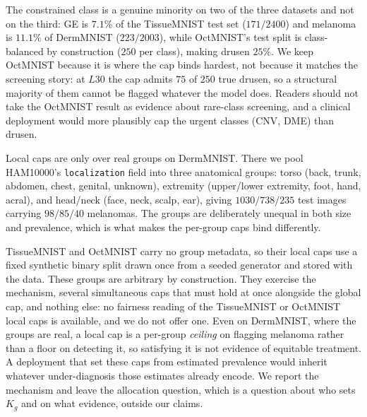 \documentclass[10pt]{article}
\begin{document}
The constrained class is a genuine minority on two of the three
datasets and not on the third: GE is $7.1\%$ of the TissueMNIST test
set ($171/2400$) and melanoma is $11.1\%$ of DermMNIST ($223/2003$),
while OctMNIST's test split is class-balanced by construction ($250$
per class), making drusen $25\%$. We keep OctMNIST because it is where
the cap binds hardest, not because it matches the screening story: at
$L30$ the cap admits $75$ of $250$ true drusen, so a structural
majority of them cannot be flagged whatever the model does. Readers
should not take the OctMNIST result as evidence about rare-class
screening, and a clinical deployment would more plausibly cap the
urgent classes (CNV, DME) than drusen.

Local caps are only over real groups on DermMNIST. There we pool
HAM10000's \texttt{localization} field into three anatomical groups:
torso (back, trunk, abdomen, chest, genital, unknown), extremity
(upper/lower extremity, foot, hand, acral), and head/neck (face, neck,
scalp, ear), giving $1030/738/235$ test images carrying $98/85/40$
melanomas. The groups are deliberately unequal in both size and
prevalence, which is what makes the per-group caps bind differently.

TissueMNIST and OctMNIST carry no group metadata, so their local caps
use a fixed synthetic binary split drawn once from a seeded generator
and stored with the data. These groups are arbitrary by construction.
They exercise the mechanism, several simultaneous caps that must hold
at once alongside the global cap, and nothing else: no fairness
reading of the TissueMNIST or OctMNIST local caps is available, and we
do not offer one. Even on DermMNIST, where the groups are real, a
local cap is a per-group \emph{ceiling} on flagging melanoma rather
than a floor on detecting it, so satisfying it is not evidence of
equitable treatment. A deployment that set these caps from estimated
prevalence would inherit whatever under-diagnosis those estimates
already encode. We report the mechanism and leave the allocation
question, which is a question about who sets $K_g$ and on what
evidence, outside our claims.
\end{document}
